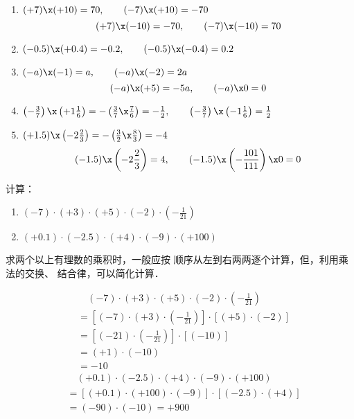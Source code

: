 \begin{solution}
	\begin{enumerate}
		\item $(+7)\x (+10)=70,\qquad (-7)\x (+10)=-70$ 
		\[(+7)\x (-10)=-70,\qquad (-7)\x (-10)=70\]
		\item $(-0.5)\x (+0.4)=-0.2,\qquad (-0.5)\x (-0.4)=0.2$
		\item $(-a)\x (-1)=a,\qquad (-a)\x (-2)=2a$  $$(-a)\x (+5)=-5a,\qquad (-a)\x 0=0$$
		\item $\left(-\frac{3}{7}\right)\x \left(+1\frac{1}{6}\right)=-\left(\frac{3}{7}\x\frac{7}{6}\right)=-\frac{1}{2},\qquad \left(-\frac{3}{7}\right)\x \left(-1\frac{1}{6}\right)=\frac{1}{2} $
		\item  $(+1.5)\x \left(-2\frac{2}{3}\right)=-\left(\frac{3}{2}\x\frac{8}{3}\right)=-4$
		\[(-1.5)\x \left(-2\frac{2}{3}\right)=4,\qquad (-1.5)\x \left(-\frac{101}{111}\right)\x 0=0 \]
	\end{enumerate}
	
\end{solution}  

\begin{example}
	计算：
	\begin{enumerate}
		\item $(-7) \cdot(+3) \cdot(+5) \cdot(-2) \cdot\left(-\frac{1}{21}\right)$
		\item 
		$(+0.1) \cdot(-2.5) \cdot(+4) \cdot(-9) \cdot(+100)$
	\end{enumerate}
\end{example}

\begin{analyze}
	求两个以上有理数的乘积时，一般应按
	顺序从左到右两两逐个计算，但，利用乘法的交换、
	结合律，可以简化计算．
\end{analyze}

\begin{solution}
	\begin{align*}
	&\quad   (-7) \cdot(+3) \cdot(+5) \cdot(-2) \cdot\left(-\frac{1}{21}\right)\\
	&=\left[(-7)\cdot (+3)\cdot \left(-\frac{1}{21}\right)\right]\cdot [(+5)\cdot (-2)]\tag{交换、结合律}\\
	&=\left[(-21)\cdot \left(-\frac{1}{21}\right)\right]\cdot [(-10)] \tag{异号相乘法则}\\
	&=(+1)\cdot (-10) \tag{同号相乘法则}\\
	&=-10 \tag{1的特性}
	\end{align*} 
	\begin{align*}
	&\quad (+0.1) \cdot(-2.5) \cdot(+4) \cdot(-9) \cdot(+100)\\
	&=[(+0.1)\cdot (+100)\cdot(-9)]\cdot[(-2.5)\cdot (+4)]\\
	&=(-90)\cdot (-10)=+900
	\end{align*}    
\end{solution}

